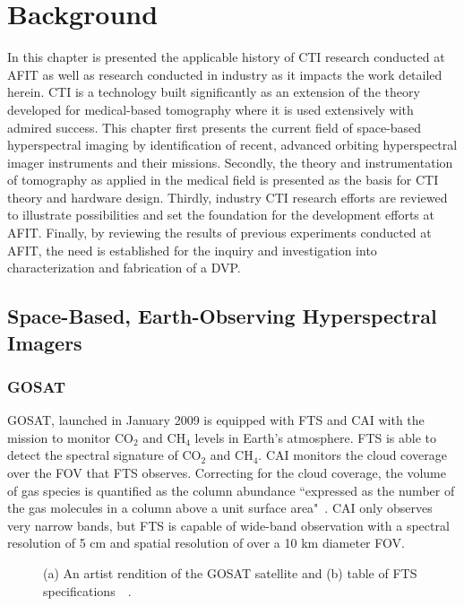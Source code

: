 \chapter{Background}
\label{ch:bkgnd}

In this chapter is presented the applicable history of \acf{CTI} research conducted at AFIT as well as research conducted in industry as it impacts the work detailed herein. \ac{CTI} is a technology built significantly as an extension of the theory developed for medical-based tomography where it is used extensively with admired success. This chapter first presents the current field of space-based hyperspectral imaging by identification of recent, advanced orbiting hyperspectral imager instruments and their missions. Secondly, the theory and instrumentation of tomography as applied in the medical field is presented as the basis for \ac{CTI} theory and hardware design. Thirdly, industry \ac{CTI} research efforts are reviewed to illustrate possibilities and set the foundation for the development efforts at \ac{AFIT}. Finally, by reviewing the results of previous experiments conducted at \ac{AFIT}, the need is established for the inquiry and investigation into characterization and fabrication of a \acl{DVP}.

\section{Space-Based, Earth-Observing Hyperspectral Imagers}
\label{sec:hyperspectralImagers}

\subsection{GOSAT}
GOSAT, launched in January 2009 is equipped with \ac{FTS} and \ac{CAI} with the mission to monitor CO$_2$ and CH$_4$ levels in Earth's atmosphere. \ac{FTS} is able to detect the spectral signature of CO$_2$ and CH$_4$. \ac{CAI} monitors the cloud coverage over the \acl{FOV} that \ac{FTS} observes. Correcting for the cloud coverage, the volume of gas species is quantified as the column abundance ``expressed as the number of the gas molecules in a column above a unit surface area"~\cite{GOSAT}. \ac{CAI} only observes very narrow bands, but \ac{FTS} is capable of wide-band observation with a spectral resolution of 5 cm and spatial resolution of over a 10 km diameter \ac{FOV}.

\begin{figure}[htb]		%
\begin{center}
\caption{(a) An artist rendition of the GOSAT satellite and (b) table of FTS specifications~\cite{GOSAT}~\cite{JapGOSAT}.}
\label{fig:GOSAT}
\end{center}
\end{figure}

